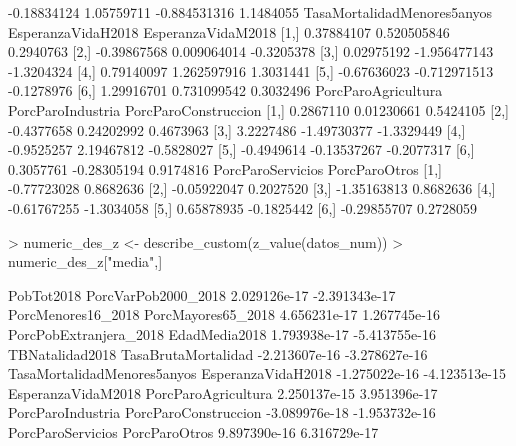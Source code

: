 \documentclass[11pt]{article}
\begin{document}
\begin{Schunk}
\begin{Soutput}
[6,]            -0.18834124    1.05759711    -0.884531316           1.1484055
     TasaMortalidadMenores5anyos EsperanzaVidaH2018 EsperanzaVidaM2018
[1,]                  0.37884107        0.520505846          0.2940763
[2,]                 -0.39867568        0.009064014         -0.3205378
[3,]                  0.02975192       -1.956477143         -1.3204324
[4,]                  0.79140097        1.262597916          1.3031441
[5,]                 -0.67636023       -0.712971513         -0.1278976
[6,]                  1.29916701        0.731099542          0.3032496
     PorcParoAgricultura PorcParoIndustria PorcParoConstruccion
[1,]           0.2867110        0.01230661            0.5424105
[2,]          -0.4377658        0.24202992            0.4673963
[3,]           3.2227486       -1.49730377           -1.3329449
[4,]          -0.9525257        2.19467812           -0.5828027
[5,]          -0.4949614       -0.13537267           -0.2077317
[6,]           0.3057761       -0.28305194            0.9174816
     PorcParoServicios PorcParoOtros
[1,]       -0.77723028     0.8682636
[2,]       -0.05922047     0.2027520
[3,]       -1.35163813     0.8682636
[4,]       -0.61767255    -1.3034058
[5,]        0.65878935    -0.1825442
[6,]       -0.29855707     0.2728059
\end{Soutput}
\begin{Sinput}
> numeric_des_z <- describe_custom(z_value(datos_num))
> numeric_des_z["media",]
\end{Sinput}
\begin{Soutput}
                 PobTot2018         PorcVarPob2000_2018 
               2.029126e-17               -2.391343e-17 
         PorcMenores16_2018          PorcMayores65_2018 
               4.656231e-17                1.267745e-16 
     PorcPobExtranjera_2018               EdadMedia2018 
               1.793938e-17               -5.413755e-16 
            TBNatalidad2018         TasaBrutaMortalidad 
              -2.213607e-16               -3.278627e-16 
TasaMortalidadMenores5anyos          EsperanzaVidaH2018 
              -1.275022e-16               -4.123513e-15 
         EsperanzaVidaM2018         PorcParoAgricultura 
               2.250137e-15                3.951396e-17 
          PorcParoIndustria        PorcParoConstruccion 
              -3.089976e-18               -1.953732e-16 
          PorcParoServicios               PorcParoOtros 
               9.897390e-16                6.316729e-17 
\end{Soutput}
\end{Schunk}
\end{document}
